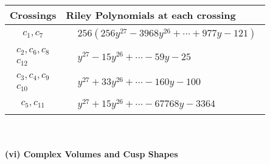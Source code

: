 \documentclass[1p]{elsarticle_modified}
\theoremstyle{definition}
\begin{document}
\begin{tabular}{m{50pt}|m{274pt}}
Crossings & \hspace{64pt}Riley Polynomials at each crossing \\
\hline $$\begin{aligned}c_{1},c_{7}\end{aligned}$$&$\begin{aligned}
&256(256 y^{27}-3968 y^{26}+\cdots+977 y-121)
\end{aligned}$\\
\hline $$\begin{aligned}c_{2},c_{6},c_{8}\\c_{12}\end{aligned}$$&$\begin{aligned}
&y^{27}-15 y^{26}+\cdots-59 y-25
\end{aligned}$\\
\hline $$\begin{aligned}c_{3},c_{4},c_{9}\\c_{10}\end{aligned}$$&$\begin{aligned}
&y^{27}+33 y^{26}+\cdots-160 y-100
\end{aligned}$\\
\hline $$\begin{aligned}c_{5},c_{11}\end{aligned}$$&$\begin{aligned}
&y^{27}+15 y^{26}+\cdots-67768 y-3364
\end{aligned}$\\
\hline
\end{tabular}\\~\\
\newpage\flushleft \textbf{(vi) Complex Volumes and Cusp Shapes}
\end{document}
